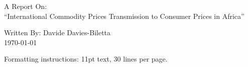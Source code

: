 \documentclass[11pt]{article}
\newcommand{\bb}{\bigbreak\noindent}
\begin{document}
	\bb
	\vspace{20em}
	\begin{center}
		\Large{A Report On:}\\
		\huge{``International Commodity Prices Transmission to Consumer Prices in Africa''}
		
	\end{center}
	\vspace{1em}
	\begin{center}
		\large{Written By: Davide Davies-Biletta}\\
		\today
	\end{center}
	\vspace{10em}
	\begin{center}
		Formatting instructions: 11pt text, 30 lines per page.
	\end{center}
	\vspace{\fill}
	
\end{document}
